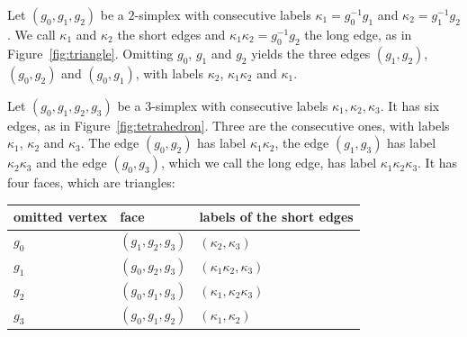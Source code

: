 \begin{example}\label{ex:triangle-tetrahedron}
	Let $(g_0,g_1,g_2)$ be a $2$-simplex with consecutive labels $\kappa_1=g_0^{-1}g_1$ and $\kappa_2=g_1^{-1}g_2$. We call $\kappa_1$ and $\kappa_2$ the short edges and $\kappa_1\kappa_2=g_0^{-1}g_2$ the long edge, as in Figure~\ref{fig:triangle}. Omitting $g_0$, $g_1$ and $g_2$ yields the three edges $(g_1,g_2)$, $(g_0,g_2)$ and $(g_0,g_1)$, with labels $\kappa_2$, $\kappa_1\kappa_2$ and $\kappa_1$.
	
	Let $(g_0,g_1,g_2,g_3)$ be a $3$-simplex with consecutive labels $\kappa_1,\kappa_2,\kappa_3$. It has six edges, as in Figure~\ref{fig:tetrahedron}. Three are the consecutive ones, with labels $\kappa_1$, $\kappa_2$ and $\kappa_3$. The edge $(g_0,g_2)$ has label $\kappa_1\kappa_2$, the edge $(g_1,g_3)$ has label $\kappa_2\kappa_3$ and the edge $(g_0,g_3)$, which we call the long edge, has label $\kappa_1\kappa_2\kappa_3$. It has four faces, which are triangles:
	\begin{center}
		\begin{tabular}{lll}
			\hline
			omitted vertex & face & labels of the short edges \\ \hline
			$g_0$ & $(g_1,g_2,g_3)$ & $(\kappa_2,\kappa_3)$ \\
			$g_1$ & $(g_0,g_2,g_3)$ & $(\kappa_1\kappa_2,\kappa_3)$ \\
			$g_2$ & $(g_0,g_1,g_3)$ & $(\kappa_1,\kappa_2\kappa_3)$ \\
			$g_3$ & $(g_0,g_1,g_2)$ & $(\kappa_1,\kappa_2)$ \\ \hline
		\end{tabular}
	\end{center}
\end{example}

